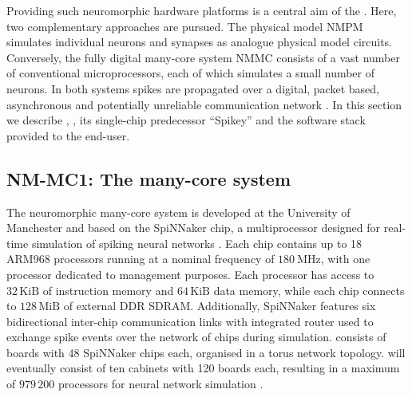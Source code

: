 Providing such neuromorphic hardware platforms is a central aim of the \HBP. Here, two complementary approaches are pursued. The physical model \acrshort{NMPM} simulates individual neurons and synapses as analogue physical model circuits. Conversely, the fully digital many-core system \acrshort{NMMC} consists of a vast number of conventional microprocessors, each of which simulates a small number of neurons. In both systems spikes are propagated over a digital, packet based, asynchronous and potentially unreliable communication network \cite{hbp_neuromorphic_platform}. In this section we describe \NMMC, \NMPM, its single-chip predecessor \enquote{Spikey} and the software stack provided to the end-user.

\subsection{NM-MC1: The many-core system}

The neuromorphic many-core system \NMMC is developed at the University of Manchester and based on the SpiNNaker chip, a multiprocessor designed for real-time simulation of spiking neural networks \cite{hbp_neuromorphic_platform}. Each chip contains up to 18 ARM968 processors running at a nominal frequency of $\SI{180}{\mega\hertz}$, with one processor dedicated to management purposes. Each processor has access to $32\,\mathrm{KiB}$ of instruction memory and $64\,\mathrm{KiB}$ data memory, while each chip connects to $128\,\mathrm{MiB}$ of external DDR SDRAM. Additionally, SpiNNaker features six bidirectional inter-chip communication links with integrated router used to exchange spike events over the network of chips during simulation. \NMMC consists of boards with 48 SpiNNaker chips each, organised in a torus network topology. \NMMC will eventually consist of ten cabinets with 120 boards each, resulting in a maximum of $979\,200$ processors for neural network simulation \cite{painkras2013spinnaker,furber2013overview}.

